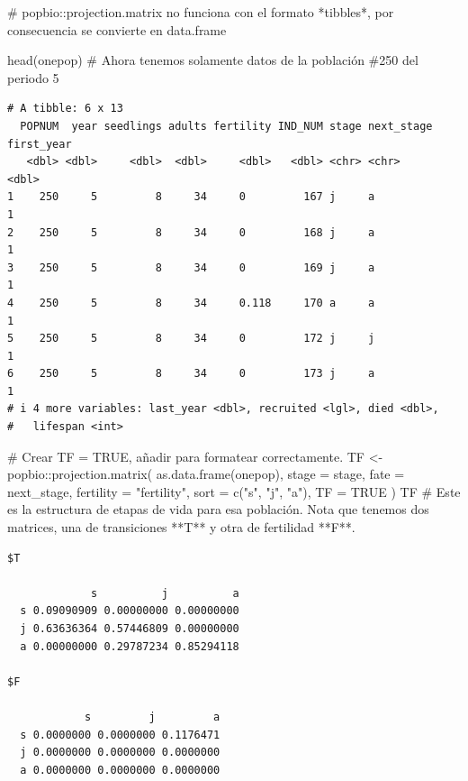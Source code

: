 \documentclass[
  12pt,
  letterpaper,
]{book}
\newenvironment{Shaded}{\begin{snugshade}}{\end{snugshade}}
\newcommand{\AttributeTok}[1]{\textcolor[rgb]{0.40,0.45,0.13}{#1}}
\newcommand{\CommentTok}[1]{\textcolor[rgb]{0.37,0.37,0.37}{#1}}
\newcommand{\ConstantTok}[1]{\textcolor[rgb]{0.56,0.35,0.01}{#1}}
\newcommand{\FunctionTok}[1]{\textcolor[rgb]{0.28,0.35,0.67}{#1}}
\newcommand{\NormalTok}[1]{\textcolor[rgb]{0.00,0.23,0.31}{#1}}
\newcommand{\OtherTok}[1]{\textcolor[rgb]{0.00,0.23,0.31}{#1}}
\newcommand{\SpecialCharTok}[1]{\textcolor[rgb]{0.37,0.37,0.37}{#1}}
\newcommand{\StringTok}[1]{\textcolor[rgb]{0.13,0.47,0.30}{#1}}
\begin{document}
\begin{Shaded}
\begin{Highlighting}[]
\CommentTok{\# popbio::projection.matrix no funciona con el formato *tibbles*, por consecuencia se convierte en data.frame}

\FunctionTok{head}\NormalTok{(onepop) }\CommentTok{\# Ahora tenemos solamente datos de la población \#250 del periodo 5}
\end{Highlighting}
\end{Shaded}

\begin{verbatim}
# A tibble: 6 x 13
  POPNUM  year seedlings adults fertility IND_NUM stage next_stage first_year
   <dbl> <dbl>     <dbl>  <dbl>     <dbl>   <dbl> <chr> <chr>           <dbl>
1    250     5         8     34     0         167 j     a                   1
2    250     5         8     34     0         168 j     a                   1
3    250     5         8     34     0         169 j     a                   1
4    250     5         8     34     0.118     170 a     a                   1
5    250     5         8     34     0         172 j     j                   1
6    250     5         8     34     0         173 j     a                   1
# i 4 more variables: last_year <dbl>, recruited <lgl>, died <dbl>,
#   lifespan <int>
\end{verbatim}

\begin{Shaded}
\begin{Highlighting}[]
\CommentTok{\# Crear TF = TRUE, añadir para formatear correctamente.}
\NormalTok{TF }\OtherTok{\textless{}{-}}\NormalTok{ popbio}\SpecialCharTok{::}\FunctionTok{projection.matrix}\NormalTok{(}
  \FunctionTok{as.data.frame}\NormalTok{(onepop),}
  \AttributeTok{stage =}\NormalTok{ stage,}
  \AttributeTok{fate =}\NormalTok{ next\_stage,}
  \AttributeTok{fertility =} \StringTok{"fertility"}\NormalTok{,}
  \AttributeTok{sort =} \FunctionTok{c}\NormalTok{(}\StringTok{"s"}\NormalTok{, }\StringTok{"j"}\NormalTok{, }\StringTok{"a"}\NormalTok{),}
  \AttributeTok{TF =} \ConstantTok{TRUE}
\NormalTok{)}
\NormalTok{TF }\CommentTok{\# Este es la estructura de etapas de vida para esa población.  Nota que tenemos dos matrices, una de transiciones **T** y otra de fertilidad **F**.}
\end{Highlighting}
\end{Shaded}

\begin{verbatim}
$T
   
             s          j          a
  s 0.09090909 0.00000000 0.00000000
  j 0.63636364 0.57446809 0.00000000
  a 0.00000000 0.29787234 0.85294118

$F
   
            s         j         a
  s 0.0000000 0.0000000 0.1176471
  j 0.0000000 0.0000000 0.0000000
  a 0.0000000 0.0000000 0.0000000
\end{verbatim}
\end{document}
